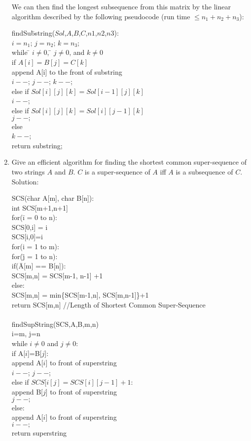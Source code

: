 \documentclass{article}
\begin{document}
\begin{enumerate}
We can then find the longest subsequence from this matrix by the linear algorithm described by the following pseudocode (run time $\le n_1+n_2+n_3$):
\begin{tabbing}
findSu\= bstring($Sol$,$A$,$B$,$C$,$n1$,$n2$,$n3$):\\
\>$i=n_1$; $j=n_2$; $k=n_3$;\\
\>while \= $i\ne 0$, \= $j\ne 0$, and $k\ne 0$\\
\>\>if $A[i]=B[j]=C[k]$\\
\>\>\> append A[i] to the front of substring\\
\>\>\>$i--$; $j--$; $k--$;\\
\>\>else if $Sol[i][j][k] = Sol[i-1][j][k]$\\
\>\>\>$i--$;\\
\>\>else if $Sol[i][j][k]=Sol[i][j-1][k]$\\
\>\>\>$j--;$\\
\>\>else\\
\>\>\>$k--$;\\
\>return substring;
\end{tabbing}
\item Give an efficient algorithm for finding the shortest common super-sequence of two strings $A$ and $B$. $C$ is a super-sequence of $A$ iff $A$ is a subsequence of $C$.
\newline
\newline Solution: \begin{tabbing}
SCS(\= char A[m], char B[n]):\\
\>int SCS[m+1,n+1]\\
\>for(\=i = 0 to n):\\
\>\>SCS[0,i] = i\\
\>\>SCS[i,0]=i\\
\>for(i = 1 to m):\\
\>\>for(\=j = 1 to n):\\
\>\>\>if(\=A[m] == B[n]):\\
\>\>\>\>SCS[m,n] = SCS[m-1, n-1] +1\\
\>\>\>else:\\
\>\>\>\>SCS[m,n] = min\{SCS[m-1,n], SCS[m,n-1]\}+1\\
\>return SCS[m,n] //Length of Shortest Common Super-Sequence\\
\\
findSupString(SCS,A,B,m,n)\\
\>i=m, j=n\\
\>while $i\ne 0$ and $j\ne 0$:\\
\>\>if A[$i$]=B[$j$]:\\
\>\>\>append A[$i$] to front of superstring\\
\>\>\>$i--$; $j--$;\\
\>\>else if $SCS[i[j]=SCS[i][j-1]+1$:\\
\>\>\>append B[$j$] to front of superstring\\
\>\>\>$j--;$\\
\>\>else:\\
\>\>\>append A[$i$] to front of superstring\\
\>\>\>$i--;$\\
\>return superstring
\end{tabbing}


\end{enumerate}
\end{document}
